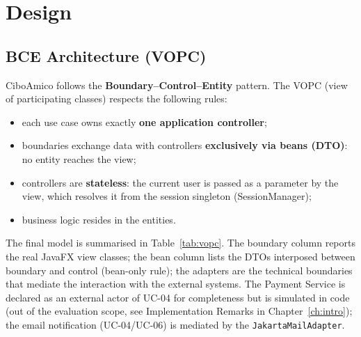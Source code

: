 \chapter{Design}\label{ch:design}

\section{BCE Architecture (VOPC)}

CiboAmico follows the \textbf{Boundary--Control--Entity} pattern. The VOPC
(view of participating classes) respects the following rules:
\begin{itemize}
    \item each use case owns exactly \textbf{one application controller};
    \item boundaries exchange data with controllers \textbf{exclusively via
    beans (DTO)}: no entity reaches the view;
    \item controllers are \textbf{stateless}: the current user is passed as a
    parameter by the view, which resolves it from the session singleton
    (SessionManager);
    \item business logic resides in the entities.
\end{itemize}

The final model is summarised in Table~\ref{tab:vopc}. The boundary
column reports the real JavaFX view classes; the bean column lists the DTOs
interposed between boundary and control (bean-only rule); the adapters are
the technical boundaries that mediate the interaction with the external
systems. The Payment Service is declared as an external actor of UC-04 for
completeness but is simulated in code (out of the evaluation scope, see
Implementation Remarks in Chapter~\ref{ch:intro}); the email notification
(UC-04/UC-06) is mediated by the \texttt{JakartaMailAdapter}.

